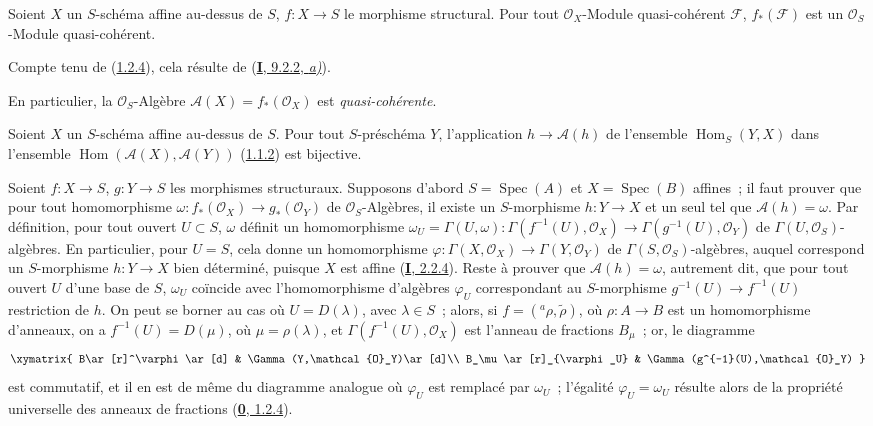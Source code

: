 \begin{proposition}[1.2.6]
\label{II.1.2.6-fr}
Soient $X$ un $S$-schéma affine au-dessus de $S$, $f:X\to S$ le morphisme
structural. Pour tout $\mathcal{O}_X$-Module quasi-cohérent $\mathcal{F}$,
$f_*(\mathcal{F})$ est un $\mathcal{O}_S$-Module quasi-cohérent.
\end{proposition}

Compte tenu de (\hyperref[II.1.2.4-fr]{1.2.4}), cela résulte de
(\hyperref[I.9.2.2-fr]{\textbf{I}, 9.2.2, \emph{a)}}).

En particulier, la $\mathcal{O}_S$-Algèbre
$\mathcal{A}(X)=f_*(\mathcal{O}_X)$ est \emph{quasi-cohérente}.

\begin{proposition}[1.2.7]
\label{II.1.2.7-fr}
Soient $X$ un $S$-schéma affine au-dessus de $S$. Pour tout $S$-préschéma
$Y$, l'application $h\to\mathcal{A}(h)$ de l'ensemble
$\operatorname{Hom}_S(Y,X)$ dans l'ensemble
$\operatorname{Hom}(\mathcal{A}(X),\mathcal{A}(Y))$
\textup{(\hyperref[II.1.1.2-fr]{1.1.2})} est bijective.
\end{proposition}

Soient $f:X\to S$, $g:Y\to S$ les morphismes structuraux. Supposons d'abord
$S=\operatorname{Spec}(A)$ et $X=\operatorname{Spec}(B)$ affines~; il faut
prouver que pour tout homomorphisme
$\omega:f_*(\mathcal{O}_X)\to g_*(\mathcal{O}_Y)$ de
$\mathcal{O}_S$-Algèbres, il existe un $S$-morphisme $h:Y\to X$ et un seul
tel que $\mathcal{A}(h)=\omega$. Par définition, pour tout ouvert $U\subset
S$, $\omega$ définit un homomorphisme
$\omega_U=\Gamma(U,\omega):\Gamma(f^{-1}(U),\mathcal{O}_X)\to\Gamma(g^{-1}(U),\mathcal{O}_Y)$
de $\Gamma(U,\mathcal{O}_S)$-algèbres. En particulier, pour $U=S$, cela
donne un homomorphisme
$\varphi:\Gamma(X,\mathcal{O}_X)\to\Gamma(Y,\mathcal{O}_Y)$ de
$\Gamma(S,\mathcal{O}_S)$-algèbres, auquel correspond un $S$-morphisme
$h:Y\to X$ bien déterminé, puisque $X$ est affine
(\hyperref[I.2.2.4-fr]{\textbf{I}, 2.2.4}). Reste à prouver que
$\mathcal{A}(h)=\omega$, autrement dit, que pour tout ouvert $U$ d'une base
de $S$, $\omega_U$ coïncide avec l'homomorphisme d'algèbres $\varphi_U$
correspondant au $S$-morphisme $g^{-1}(U)\to f^{-1}(U)$ restriction de $h$.
On peut se borner au cas où $U=D(\lambda)$, avec $\lambda\in S$~; alors, si
$f=({}^a\rho,\widetilde{\rho})$, où $\rho:A\to B$ est un homomorphisme
d'anneaux, on a $f^{-1}(U)=D(\mu)$, où $\mu=\rho(\lambda)$, et
$\Gamma(f^{-1}(U),\mathcal{O}_X)$ est l'anneau de fractions $B_\mu$~; or,
le diagramme
\[
  \xymatrix{
    B\ar[r]^\varphi\ar[d] & \Gamma(Y,\mathcal{O}_Y)\ar[d]\\
    B_\mu\ar[r]_{\varphi_U} & \Gamma(g^{-1}(U),\mathcal{O}_Y)
  }
\]
est commutatif, et il en est de même du diagramme analogue où $\varphi_U$
est remplacé par $\omega_U$~; l'égalité $\varphi_U=\omega_U$ résulte alors
de la propriété universelle des anneaux de fractions
(\hyperref[0.1.2.4-fr]{\textbf{0}, 1.2.4}).

